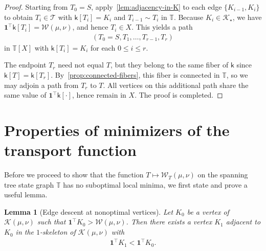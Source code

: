 \documentclass[10pt,a4paper]{amsart}
\newcommand{\wass}{{\mathcal{W}}}
\newcommand{\setoftrees}{{\mathcal{T}}}
\newcommand{\stategraph}{{\mathbb{T}}}
\newcommand{\embedding}{{\mathsf{k}}}
\newcommand{\flowpoly}{{\mathcal{K}}}
\newtheorem{lemma}[theorem]{Lemma}
\begin{document}
\begin{proof}
        Starting from $T_0 = S$, apply~\cref{lem:adjacency-in-K} to each edge $\{K_{i-1},K_i\}$ to obtain $T_i\in\setoftrees$ with $\embedding[T_i]=K_i$ and $T_{i-1}\sim T_i$ in $\stategraph$. Because $K_i\in\flowpoly_\star$, we have $\mathbf{1}^\top \embedding[T_i] = \wass(\mu,\nu)$, and hence $T_i\in X$. This yields a path
            \begin{align*}
                (T_0 = S, T_1, \dotsc, T_{r-1}, T_{r})
            \end{align*}
        in $\stategraph[X]$ with $\embedding[T_i]=K_i$ for each $0\le i\le r$.

        The endpoint $T_{r}$ need not equal $T$, but they belong to the same fiber of $\embedding$ since $\embedding[T]=\embedding[T_r]$. By~\cref{prop:connected-fibers}, this fiber is connected in $\stategraph$, so we may adjoin a path from $T_{r}$ to $T$. All vertices on this additional path share the same value of $\mathbf{1}^\top \embedding[\cdot]$, hence remain in $X$. The proof is completed.
    \end{proof}

\section{Properties of minimizers of the transport function}\label{sec:no-local-minima}

Before we proceed to show that the function $T\mapsto \wass_T(\mu,\nu)$ on the spanning tree state graph $\stategraph$ has no suboptimal local minima, we first state and prove a useful lemma.

\begin{lemma}[Edge descent at nonoptimal vertices]\label{lem:edge-descent-polytope}
    Let $K_0$ be a vertex of $\flowpoly(\mu,\nu)$ such that $\mathbf{1}^\top K_0 > \wass(\mu,\nu)$. Then there exists a vertex $K_1$ adjacent to $K_0$ in the $1$-skeleton of $\flowpoly(\mu,\nu)$ with
        \begin{align*}
            \mathbf{1}^\top K_1 < \mathbf{1}^\top K_0.
        \end{align*}
\end{lemma}
\end{document}
